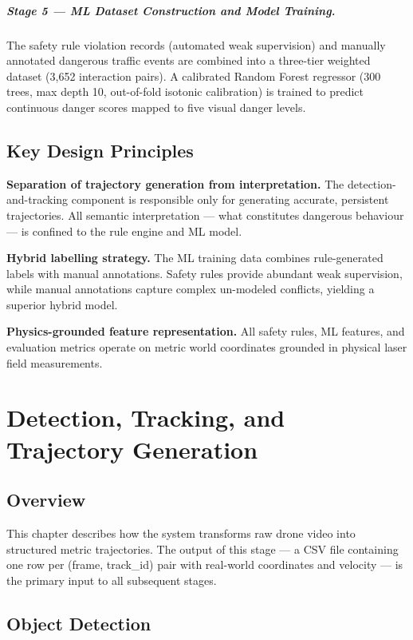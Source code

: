 \documentclass[12pt,a4paper]{report}
\begin{document}
\paragraph{Stage 5 — ML Dataset Construction and Model Training.}
The safety rule violation records (automated weak supervision) and manually annotated dangerous traffic events are combined into a three-tier weighted dataset (3,652 interaction pairs). A calibrated Random Forest regressor (300 trees, max depth 10, out-of-fold isotonic calibration) is trained to predict continuous danger scores mapped to five visual danger levels.

\section{Key Design Principles}

\textbf{Separation of trajectory generation from interpretation.}
The detection-and-tracking component is responsible only for generating accurate, persistent trajectories. All semantic interpretation --- what constitutes dangerous behaviour --- is confined to the rule engine and ML model.

\textbf{Hybrid labelling strategy.}
The ML training data combines rule-generated labels with manual annotations. Safety rules provide abundant weak supervision, while manual annotations capture complex un-modeled conflicts, yielding a superior hybrid model.

\textbf{Physics-grounded feature representation.}
All safety rules, ML features, and evaluation metrics operate on metric world coordinates grounded in physical laser field measurements.
\clearpage\thispagestyle{empty}\newpage

\chapter{Detection, Tracking, and Trajectory Generation}
\label{chap:detection}

\section{Overview}

This chapter describes how the system transforms raw drone video into structured metric
trajectories.  The output of this stage --- a CSV file containing one row per
(frame, track\_id) pair with real-world coordinates and velocity --- is the primary input
to all subsequent stages.

\section{Object Detection}
\end{document}

